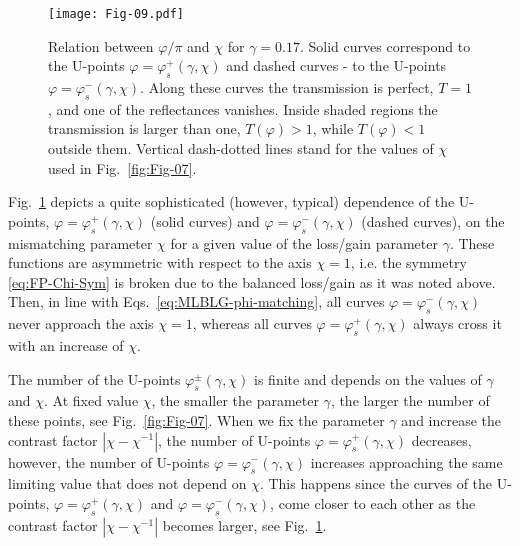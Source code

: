 \documentclass[aps,pra,reprint,showpacs,bibnotes,preprintnumbers,twoside,eqsecnum]{revtex4-1}
\begin{document}
\begin{figure}[t]
\centering
\texttt{[image: Fig-09.pdf]}
\caption{Relation between $\varphi/\pi$ and $\chi$ for $\gamma=0.17$. Solid curves correspond to the U-points $\varphi=\varphi^{+}_s(\gamma,\chi)$ and dashed curves - to the U-points $\varphi=\varphi^{-}_s(\gamma,\chi)$. Along these curves the transmission is perfect, $T=1$, and one of the reflectances vanishes. Inside shaded regions the transmission is larger than one, $T(\varphi)>1$, while $T(\varphi)<1$ outside them. Vertical dash-dotted lines stand for the values of $\chi$ used in Fig.~\ref{fig:Fig-07}.}\label{fig:Fig-09}
\end{figure}

Fig.~\ref{fig:Fig-09} depicts a quite sophisticated (however, typical) dependence of the U-points, $\varphi=\varphi^{+}_s(\gamma,\chi)$ (solid curves) and $\varphi=\varphi^{-}_s(\gamma,\chi)$ (dashed curves), on the mismatching parameter $\chi$ for a given value of the loss/gain parameter $\gamma$. These functions are asymmetric with respect to the axis $\chi=1$, i.e. the symmetry \eqref{eq:FP-Chi-Sym} is broken due to the balanced loss/gain as it was noted above. Then, in line with Eqs.~\eqref{eq:MLBLG-phi-matching}, all curves $\varphi=\varphi^{-}_s(\gamma,\chi)$ never approach the axis $\chi=1$, whereas all curves $\varphi=\varphi^{+}_s(\gamma,\chi)$ always cross it with an increase of $\chi$.

The number of the U-points $\varphi_s^{\pm}(\gamma,\chi)$ is finite and depends on the values of $\gamma$ and $\chi$. At fixed value $\chi$, the smaller the parameter $\gamma$, the larger the number of these points, see Fig.~\ref{fig:Fig-07}. When we fix the parameter $\gamma$ and increase the contrast factor $|\chi-\chi^{-1}|$, the number of U-points $\varphi=\varphi^{+}_s(\gamma,\chi)$ decreases, however, the number of U-points $\varphi=\varphi^{-}_s(\gamma,\chi)$ increases approaching the same limiting value that does not depend on $\chi$. This happens since the curves of the U-points, $\varphi=\varphi^{+}_s(\gamma,\chi)$ and $\varphi=\varphi^{-}_s(\gamma,\chi)$, come closer to each other as the contrast factor $|\chi-\chi^{-1}|$ becomes larger, see Fig.~\ref{fig:Fig-09}.
\end{document}
